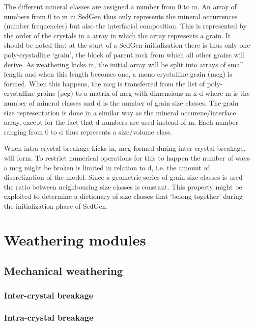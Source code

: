 The different mineral classes are assigned a number from 0 to m. %
An array of numbers from 0 to m in SedGen thus only represents the mineral occurrences (number frequencies) but also the interfacial composition. %
This is represented by the order of the crystals in a array in which the array represents a grain. %
It should be noted that at the start of a SedGen initialization there is thus only one poly-crystalline `grain', the block of parent rock from which all other grains will derive. %
As weathering kicks in, the initial array will be split into arrays of small length and when this length becomes one, a mono-crystalline grain (mcg) is formed. %
When this happens, the mcg is transferred from the list of poly-crystalline grains (pcg) to a matrix of mcg with dimensions m x d where m is the number of mineral classes and d is the number of grain size classes. %
The grain size representation is done in a similar way as the mineral occurene/interface array, except for the fact that d numbers are used instead of m. %
Each number ranging from 0 to d thus represents a size/volume class. %


When intra-crystal breakage kicks in, mcg formed during inter-crystal breakage, will form. %
To restrict numerical operations for this to happen the number of ways a mcg might be broken is limited in relation to d, i.e. the amount of discretization of the model. %
Since a geometric series of grain size classes is used the ratio between neighbouring size classes is constant. %
This property might be exploited to determine a dictionary of size classes that `belong together' during the initialization phase of SedGen. %




\section{Weathering modules}
    \subsection{Mechanical weathering}
        \subsubsection{Inter-crystal breakage}

        \subsubsection{Intra-crystal breakage}

